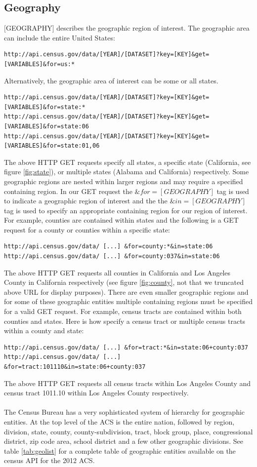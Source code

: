 \documentclass{article}\usepackage[]{graphicx}\usepackage[]{color}
\begin{document}
\subsection{Geography}
$[$GEOGRAPHY$]$ describes the geographic region of interest.  The geographic area can include the entire United States:
\begin{verbatim}
http://api.census.gov/data/[YEAR]/[DATASET]?key=[KEY]&get=[VARIABLES]&for=us:*
\end{verbatim}
Alternatively, the geographic area of interest can be some or all states.
\begin{verbatim}
http://api.census.gov/data/[YEAR]/[DATASET]?key=[KEY]&get=[VARIABLES]&for=state:*
http://api.census.gov/data/[YEAR]/[DATASET]?key=[KEY]&get=[VARIABLES]&for=state:06
http://api.census.gov/data/[YEAR]/[DATASET]?key=[KEY]&get=[VARIABLES]&for=state:01,06
\end{verbatim}
The above HTTP GET requests specify all states, a specific state (California, see figure \ref{fig:state}), or multiple states (Alabama and California) respectively.  Some geographic regions are nested within larger regions and may require a specified containing region.  In our GET request the $\&for=[GEOGRAPHY]$ tag is used to indicate a geographic region of interest and the the $\&in=[GEOGRAPHY]$ tag is used to specify an appropriate containing region for our region of interest.  For example, counties are contained within states and the following is a GET request for a county or counties within a specific state:
\begin{verbatim}
http://api.census.gov/data/ [...] &for=county:*&in=state:06
http://api.census.gov/data/ [...] &for=county:037&in=state:06
\end{verbatim}
The above HTTP GET requests all counties in California and Los Angeles County in California respectively (see figure \ref{fig:county}, not that we truncated above URL for display purposes).  There are even smaller geographic regions and for some of these geographic entities multiple containing regions must be specified for a valid GET request.  For example, census tracts are contained within both counties and states.  Here is how specify a census tract or multiple census tracts within a county and state:
\begin{verbatim}
http://api.census.gov/data/ [...] &for=tract:*&in=state:06+county:037
http://api.census.gov/data/ [...] &for=tract:101110&in=state:06+county:037
\end{verbatim}
The above HTTP GET requests all census tracts within Los Angeles County and census tract 1011.10 within Los Angeles County respectively.\\
\\
The Census Bureau has a very sophisticated system of hierarchy for geographic entities.  At the top level of the ACS is the entire nation, followed by region, division, state, county, county-subdivision, tract, block group, place, congressional district, zip code area, school district and a few other geographic divisions.  See table \ref{tab:geolist} for a complete table of geographic entities available on the census API for the 2012 ACS.\\
\end{document}
